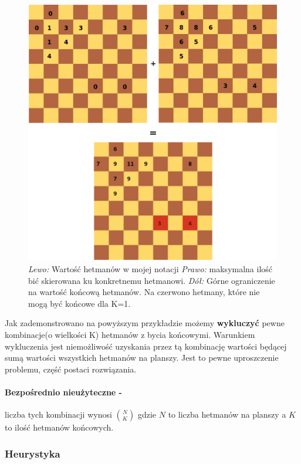 \documentclass{article}
\begin{document}
\begin{figure}[!ht]
  \centering
      \includegraphics[scale=0.25]{obs1a.png}
  \caption{\textit{Lewo:} Wartość hetmanów w mojej notacji \textit{Prawo:} maksymalna ilość bić skierowana ku konkretnemu hetmanowi.\textit{ Dół:} Górne ograniczenie na wartość końcową hetmanów. Na czerwono hetmany, które nie mogą być końcowe dla K=1.}
  
\end{figure}

Jak zademonstrowano na powyższym przykładzie możemy \textbf{wykluczyć} pewne kombinacje(o wielkości K) hetmanów z bycia końcowymi. Warunkiem wykluczenia jest niemożliwość uzyskania przez tą kombinację wartości będącej sumą wartości wszystkich hetmanów na planszy. Jest to pewne uproszczenie problemu, część postaci rozwiązania.

\paragraph{Bezpośrednio nieużyteczne -}liczba tych kombinacji wynosi $\binom{N} {K}$ gdzie $N$ to liczba hetmanów na planszy a $K$ to ilość hetmanów końcowych.

\subsubsection{Heurystyka}
\end{document}
